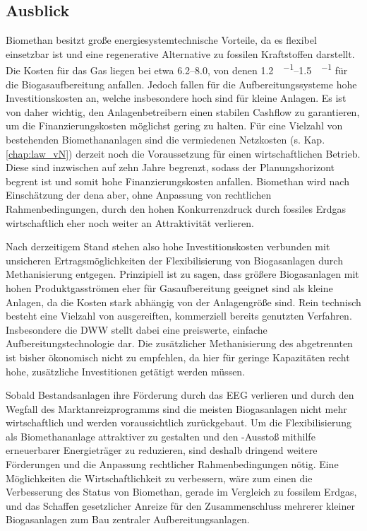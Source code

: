 \subsection{Ausblick}

Biomethan besitzt große energiesystemtechnische Vorteile, da es flexibel einsetzbar ist und eine regenerative Alternative zu fossilen Kraftstoffen darstellt. Die Kosten für das Gas liegen bei etwa \SIrange{6,2}{8,0}{\ctkwh}, von denen \SIrange{1,2}{1,5}{\ct\per\kwh} für die Biogasaufbereitung anfallen. Jedoch fallen für die Aufbereitungssysteme hohe Investitionskosten an, welche insbesondere hoch sind für kleine Anlagen. Es ist von daher wichtig, den Anlagenbetreibern einen stabilen Cashflow zu garantieren, um die Finanzierungskosten möglichst gering zu halten. Für eine Vielzahl von bestehenden Biomethananlagen sind die vermiedenen Netzkosten (s. Kap. \ref{chap:law_vN}) derzeit noch die Voraussetzung für einen wirtschaftlichen Betrieb. Diese sind inzwischen auf zehn Jahre begrenzt, sodass der Planungshorizont begrent ist und somit hohe Finanzierungskosten anfallen. Biomethan wird nach Einschätzung der dena aber, ohne Anpassung von rechtlichen Rahmenbedingungen, durch den hohen Konkurrenzdruck durch fossiles Erdgas wirtschaftlich eher noch weiter an Attraktivität verlieren.  \parencite{dena2018} \smallskip

Nach derzeitigem Stand stehen also hohe Investitionskosten verbunden mit unsicheren Ertragsmöglichkeiten der Flexibilisierung von Biogasanlagen durch Methanisierung entgegen. Prinzipiell ist zu sagen, dass größere Biogasanlagen mit hohen Produktgasströmen eher für Gasaufbereitung geeignet sind als kleine Anlagen, da die Kosten stark abhängig von der Anlagengröße sind. Rein technisch besteht eine Vielzahl von ausgereiften, kommerziell bereits genutzten Verfahren. Insbesondere die \gls{DWW} stellt dabei eine preiswerte, einfache Aufbereitungstechnologie dar. Die zusätzlicher Methanisierung des abgetrennten  ist bisher ökonomisch nicht zu empfehlen, da hier für geringe Kapazitäten recht hohe, zusätzliche Investitionen getätigt werden müssen. \smallskip

Sobald Bestandsanlagen ihre Förderung durch das \gls{EEG} verlieren und durch den Wegfall des Marktanreizprogramms sind die meisten Biogasanlagen nicht mehr wirtschaftlich und werden voraussichtlich zurückgebaut. Um die Flexibilisierung als Biomethananlage attraktiver zu gestalten und den -Ausstoß mithilfe erneuerbarer Energieträger zu reduzieren, sind deshalb dringend weitere Förderungen und die Anpassung rechtlicher Rahmenbedingungen nötig. Eine Möglichkeiten die Wirtschaftlichkeit zu verbessern, wäre zum einen die Verbesserung des Status von Biomethan, gerade im Vergleich zu fossilem Erdgas, und das Schaffen gesetzlicher Anreize für den Zusammenschluss mehrerer kleiner Biogasanlagen zum Bau zentraler Aufbereitungsanlagen. \parencite{UmBA19}